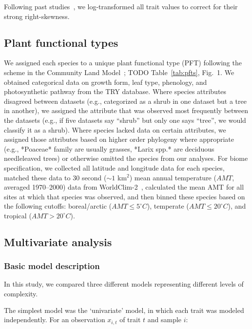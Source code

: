 Following past studies~\cite{wright_worldwide_2004,wright_assessing_2005,onoda_2011_global,diaz_global_2016}, we log-transformed all trait values to correct for their strong right-skewness.

\subsection{Plant functional types}

We assigned each species to a unique plant functional type (PFT) following the scheme in the Community Land Model~\cite[CLM4.5, ]{clm45_note}; TODO Table~\ref{tab:pfts}, Fig.\ 1.
We obtained categorical data on growth form, leaf type, phenology, and photosynthetic pathway from the TRY database.
Where species attributes disagreed between datasets (e.g., categorized as a shrub in one dataset but a tree in another), we assigned the attribute that was observed most frequently between the datasets (e.g., if five datasets say ``shrub'' but only one says ``tree'', we would classify it as a shrub).
Where species lacked data on certain attributes, we assigned those attributes based on higher order phylogeny where appropriate (e.g., *Poaceae* family are usually grasses, *Larix spp.* are deciduous needleleaved trees) or otherwise omitted the species from our analyses.
For biome specification, we collected all latitude and longitude data for each species,
matched these data to 30 second ($\sim1$ km$^{2}$) mean annual temperature ($AMT$, averaged 1970--2000) data from WorldClim-2~\cite{worldclim},
calculated the mean AMT for all sites at which that species was observed,
and then binned these species based on the following cutoffs: boreal/arctic ($AMT \leq 5^\circ C$), temperate ($AMT \leq 20^\circ C$), and tropical ($AMT > 20^\circ C$).


\subsection{Multivariate analysis}

\subsubsection{Basic model description}

In this study, we compared three different models representing different levels of complexity.

The simplest model was the ‘univariate’ model, in which each trait was modeled independently.
For an observation $x_{i,t}$ of trait $t$ and sample $i$:


